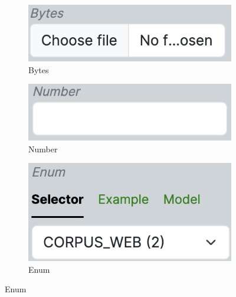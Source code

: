 \begin{figure}[!htb]
    \centering
    \captionsetup{justification=centering}

    \begin{subfigure}{.33\textwidth}
        \centering
        \includegraphics[width=.95\linewidth]{images/implementation/screenshots/input-bytes}
        \caption{Bytes}
    \end{subfigure}%
    \begin{subfigure}{.33\textwidth}
        \centering
        \includegraphics[width=.95\linewidth]{images/implementation/screenshots/input-number}
        \caption{Number}
    \end{subfigure}
    \begin{subfigure}{.33\textwidth}
        \centering
        \includegraphics[width=.95\linewidth]{images/implementation/screenshots/input-enum}
        \caption{Enum}
    \end{subfigure}%


\end{figure}
